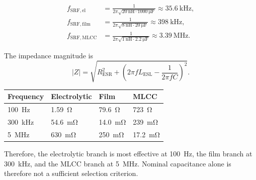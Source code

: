 
\begin{solutionblock}
    \begin{align}
        f_\mathrm{SRF,el}
        &=\frac{1}{2\pi\sqrt{\SI{20}{\nano\henry}\cdot\SI{1000}{\micro\farad}}}
        \approx\SI{35.6}{\kilo\hertz},\\
        f_\mathrm{SRF,film}
        &=\frac{1}{2\pi\sqrt{\SI{8}{\nano\henry}\cdot\SI{20}{\micro\farad}}}
        \approx\SI{398}{\kilo\hertz},\\
        f_\mathrm{SRF,MLCC}
        &=\frac{1}{2\pi\sqrt{\SI{1}{\nano\henry}\cdot\SI{2.2}{\micro\farad}}}
        \approx\SI{3.39}{\mega\hertz}.
    \end{align}
\end{solutionblock}


\begin{solutionblock}
    The impedance magnitude is
    \begin{equation}
        |Z|=\sqrt{R_\mathrm{ESR}^2+
        \left(2\pi fL_\mathrm{ESL}-\frac{1}{2\pi fC}\right)^2}.
    \end{equation}

    \begin{center}
        \begin{tabular}{llll}
            \toprule
            Frequency & Electrolytic & Film & MLCC \\
            \midrule
            \SI{100}{\hertz} & \SI{1.59}{\ohm} & \SI{79.6}{\ohm} & \SI{723}{\ohm} \\
            \SI{300}{\kilo\hertz} & \SI{54.6}{\milli\ohm} & \SI{14.0}{\milli\ohm} & \SI{239}{\milli\ohm} \\
            \SI{5}{\mega\hertz} & \SI{630}{\milli\ohm} & \SI{250}{\milli\ohm} & \SI{17.2}{\milli\ohm} \\
            \bottomrule
        \end{tabular}
    \end{center}

    Therefore, the electrolytic branch is most effective at \SI{100}{\hertz},
    the film branch at \SI{300}{\kilo\hertz}, and the MLCC branch at
    \SI{5}{\mega\hertz}. Nominal capacitance alone is therefore not a sufficient
    selection criterion.
\end{solutionblock}

